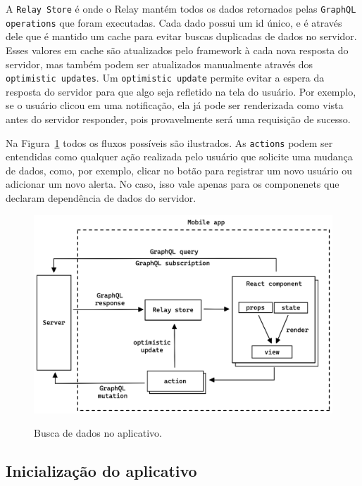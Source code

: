A \texttt{Relay Store} é onde o Relay mantém todos os dados retornados pelas \texttt{GraphQL operations} que foram executadas. Cada dado possui um id único, e é através dele que é mantido um cache para evitar buscas duplicadas de dados no servidor. Esses valores em cache são atualizados pelo framework à cada nova resposta do servidor, mas também podem ser atualizados manualmente através dos \texttt{optimistic updates}. Um \texttt{optimistic update} permite evitar a espera da resposta do servidor para que algo seja refletido na tela do usuário. Por exemplo, se o usuário clicou em uma notificação, ela já pode ser renderizada como vista antes do servidor responder, pois provavelmente será uma requisição de sucesso.

Na Figura~\ref{f.system_app} todos os fluxos possíveis são ilustrados. As \texttt{actions} podem ser entendidas como qualquer ação realizada pelo usuário que solicite uma mudança de dados, como, por exemplo, clicar no botão para registrar um novo usuário ou adicionar um novo alerta. No caso, isso vale apenas para os componenets que declaram dependência de dados do servidor.

\begin{figure}[htbp]
	\caption{\small Busca de dados no aplicativo.}
	\centering
	\includegraphics[width=\textwidth]{../diagrams/out/system_app.png}
	\label{f.system_app}
\end{figure}

\FloatBarrier

\subsection{Inicialização do aplicativo}

